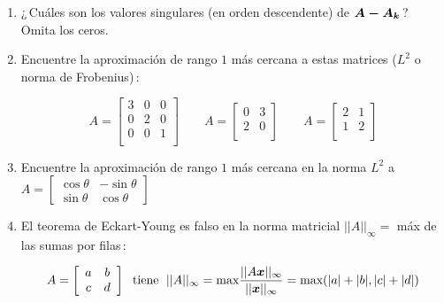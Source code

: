 \documentclass[12pt,a4paper]{article}
\newcommand{\bi}[1]{\hbox{\boldmath$#1$}}
\newcommand\1{\mbox{\,\vrule height-0.8pt depth1.0pt width2pc\,}}
\newcommand\2{\mbox{\,\vrule height-0.8pt depth1.0pt width1pc\,}}
\begin{document}
\begin{enumerate}
   \item ¿\,Cuáles son los valores singulares (en orden descendente) de $\bi{A-A_k}$\,? Omita los ceros.
\item Encuentre la aproximación de rango $1$ más cercana a estas matrices ($L^2$ o norma de Frobenius)\,:

\vspace{-5pt}
$$
A=\left[\begin{array}{ccc}3&0&0\\0&2&0\\0&0&1\\\end{array}\right]\qquad
A=\left[\begin{array}{cc}0&3\\2&0\\\end{array}\right]\qquad
A=\left[\begin{array}{cc}2&1\\1&2\\\end{array}\right]
$$

\vspace{-8pt}
\item Encuentre la aproximación de rango $1$ más cercana en la norma $L^2$ a $A=\left[\begin{array}{rr}\cos\theta&-\sin\theta\\\sin\theta&\cos\theta\end{array}\right]$
\item El teorema de Eckart-Young es falso en la norma matricial $||A||_\infty=$ máx de las sumas por filas\,:

\vspace{-5pt}
$$
A=\left[\begin{array}{cc}a&b\\c&d\\\end{array}\right]\text{ \;tiene\; } ||A||_\infty=\hbox{max}\dfrac{||A\bi{x}||_\infty}{||\bi{x}||_\infty}=\hbox{max}(|a|+|b|, |c|+|d|)
$$



\end{enumerate}
\end{document}
